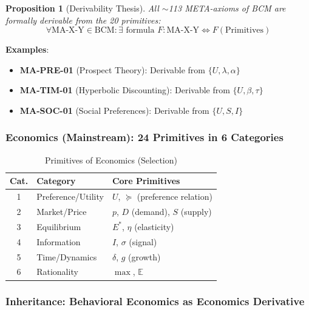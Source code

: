 \documentclass[11pt,a4paper]{article}
\newtheorem{proposition}{Proposition}[section]
\begin{document}
\begin{proposition}[Derivability Thesis]
\label{prop:derivability}
All $\sim$113 META-axioms of BCM are formally derivable from the 20 primitives:
\begin{equation}
\forall \text{MA-X-Y} \in \text{BCM}: \exists \text{ formula } F: \text{MA-X-Y} \Leftrightarrow F(\text{Primitives})
\end{equation}
\end{proposition}

\textbf{Examples}:
\begin{itemize}
    \item \textbf{MA-PRE-01} (Prospect Theory): Derivable from $\{U, \lambda, \alpha\}$
    \item \textbf{MA-TIM-01} (Hyperbolic Discounting): Derivable from $\{U, \beta, \tau\}$
    \item \textbf{MA-SOC-01} (Social Preferences): Derivable from $\{U, S, I\}$
\end{itemize}

\subsubsection{Economics (Mainstream): 24 Primitives in 6 Categories}

\begin{table}[h]
\centering
\caption{Primitives of Economics (Selection)}
\label{tab:primitive-econ}
\begin{tabular}{cll}
\toprule
\textbf{Cat.} & \textbf{Category} & \textbf{Core Primitives} \\
\midrule
1 & Preference/Utility & $U$, $\succeq$ (preference relation) \\
2 & Market/Price & $p$, $D$ (demand), $S$ (supply) \\
3 & Equilibrium & $E^*$, $\eta$ (elasticity) \\
4 & Information & $I$, $\sigma$ (signal) \\
5 & Time/Dynamics & $\delta$, $g$ (growth) \\
6 & Rationality & $\max$, $\mathbb{E}$ \\
\bottomrule
\end{tabular}
\end{table}

\subsubsection{Inheritance: Behavioral Economics as Economics Derivative}
\end{document}
